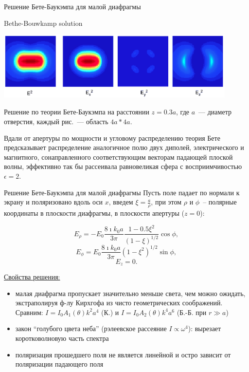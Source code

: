\documentclass[9pt, compress, xcolor=table]{beamer}
\begin{document}
\begin{frame}{Решение Бете-Баукэмпа для малой диафрагмы}

Bethe-Bouwkamp solution

\begin{center}
\includegraphics[width=0.9\textwidth]{bb}
\end{center}
Решение по теории Бете-Баукэмпа на расстоянии $z=0.3 a$, где $a$~--- диаметр отверстия, каждый рис.~--- область $4a*4a$.

Вдали от апертуры по мощности и угловому распределению теория Бете предсказывает распределение аналогичное полю двух диполей, электрического  и магнитного, сонаправленного соответствующим векторам падающей плоской волны, эффективно так бы рассеивала равновеликая сфера с восприимчивостью $\epsilon=2$. 

\end{frame}

\begin{frame}{Решение Бете-Баукэмпа для малой диафрагмы}
Пусть поле падает по нормали к экрану и поляризовано вдоль оси $x$, введем $\xi = \frac{a}{\rho}$, при этом $\rho$ и $\phi$~-- полярные координаты в плоскости диафрагмы, в плоскости апертуры ($z=0$):

\begin{equation*}
E_{\rho} = -E_0\frac{8\imath k_0 a}{3\pi}\frac{1-0.5\xi^2}{(1-\xi)^{1/2}}\cos \phi,
\end{equation*}
\begin{equation*}
E_{\phi} = E_0\frac{8\imath k_0 a}{3\pi}(1-\xi^2)^{1/2}\sin \phi,
\end{equation*}
\begin{equation*}
E_{z} = 0.
\end{equation*}

\underline{Свойства решения:}
\begin{itemize}
\item малая диафрагма пропускает значительно меньше света, чем можно ожидать, экстраполируя ф-лу Кирхгофа из чисто геометрических соображений. Сравним: $I=I_0 A_1(\theta) k^2a^4$ (К.) и $I=I_0 A_2(\theta) k^4a^6$ (Б.-Б. при $r\gg a$)
\item закон ``голубого цвета неба'' (рэлеевское рассеяние $I \propto \omega^4$): вырезает коротковолновую часть спектра
\item поляризация прошедшего поля не является линейной и остро зависит от поляризации падающего поля
\end{itemize}
\end{frame}
\end{document}
